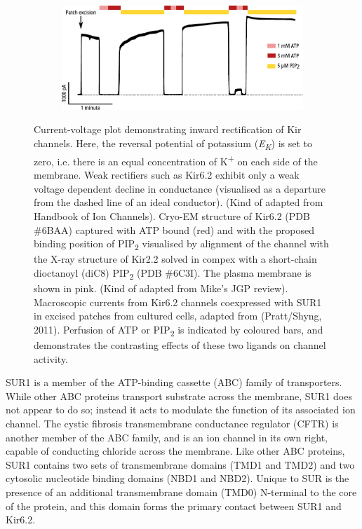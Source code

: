 \begin{figure}[h]
\begin{subfigure}[t]{0.9\textwidth}
		\centering
		\includegraphics[width=\textwidth]{shyng_atp_pip_trace.pdf}
	\end{subfigure}
	\caption[Structure of Kir6.2]{
		 Current-voltage plot demonstrating inward rectification of Kir channels.
		Here, the reversal potential of potassium (\textit{E\textsubscript{K}}) is set to zero, i.e. there is an equal concentration of K\textsuperscript{+} on each side of the membrane.
		Weak rectifiers such as Kir6.2 exhibit only a weak voltage dependent decline in conductance (visualised as a departure from the dashed line of an ideal conductor).
		(Kind of adapted from Handbook of Ion Channels).
		 Cryo-EM structure of Kir6.2 (PDB \#6BAA) captured with ATP bound (red) and with the proposed binding position of PIP\textsubscript{2} visualised by alignment of the channel with the X-ray structure of Kir2.2 solved in compex with a short-chain dioctanoyl (diC8) PIP\textsubscript{2} (PDB \#6C3I).
		The plasma membrane is shown in pink.
		(Kind of adapted from Mike's JGP review).
		 Macroscopic currents from Kir6.2 channels coexpressed with SUR1 in excised patches from cultured cells, adapted from (Pratt/Shyng, 2011).
		Perfusion of ATP or PIP\textsubscript{2} is indicated by coloured bars, and demonstrates the contrasting effects of these two ligands on channel activity.
	}
	\label{ch1fig:kir_breakdown}
\end{figure}

SUR1 is a member of the ATP-binding cassette (ABC) family of transporters.
While other ABC proteins transport substrate across the membrane, SUR1 does not appear to do so; instead it acts to modulate the function of its associated ion channel.
The cystic fibrosis transmembrane conductance regulator (CFTR) is another member of the ABC family, and is an ion channel in its own right, capable of conducting chloride across the membrane.
Like other ABC proteins, SUR1 contains two sets of transmembrane domains (TMD1 and TMD2) and two cytosolic nucleotide binding domains (NBD1 and NBD2).
Unique to SUR is the presence of an additional transmembrane domain (TMD0) N-terminal to the core of the protein, and this domain forms the primary contact between SUR1 and Kir6.2.

